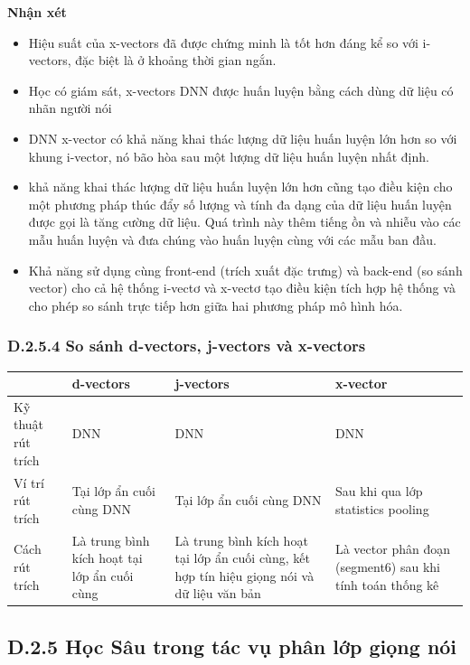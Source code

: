 \documentclass{article}
\begin{document}
	\textbf{Nhận xét}
	\begin{itemize}
		\item Hiệu suất của x-vectors đã được chứng minh là tốt hơn đáng kể so với i-vectors, đặc biệt là ở khoảng thời gian ngắn.
		\item Học có giám sát, x-vectors DNN được huấn luyện bằng cách dùng dữ liệu có nhãn người nói
		\item DNN x-vector có khả năng khai thác lượng dữ liệu huấn luyện lớn hơn so với khung i-vector, nó bão hòa sau một lượng dữ liệu huấn luyện nhất định.
		\item khả năng khai thác lượng dữ liệu huấn luyện lớn hơn cũng tạo điều kiện cho một phương pháp thúc đẩy số lượng và tính đa dạng của dữ liệu huấn luyện được gọi là tăng cường dữ liệu. Quá trình này thêm tiếng ồn và nhiễu vào các mẫu huấn luyện và đưa chúng vào huấn luyện cùng với các mẫu ban đầu.
		\item Khả năng sử dụng cùng front-end (trích xuất đặc trưng) và back-end (so sánh vector) cho cả hệ thống i-vectơ và x-vectơ tạo điều kiện tích hợp hệ thống và cho phép so sánh trực tiếp hơn giữa hai phương pháp mô hình hóa.
	\end{itemize}
	
	\subsubsection{D.2.5.4 So sánh d-vectors, j-vectors và x-vectors}
		\begin{table}[H]
		\centering
		\begin{tabular}{ |p{2cm} |p{4cm} | p{4cm} | p{4cm}  |}\hline
			& d-vectors & j-vectors & x-vector \\\hline
			Kỹ thuật rút trích & DNN & DNN & DNN\\ \hline
			Ví trí rút trích & Tại lớp ẩn cuối cùng DNN & Tại lớp ẩn cuối cùng DNN & Sau khi qua lớp statistics pooling\\\hline
			Cách rút trích & Là trung bình kích hoạt tại lớp ẩn cuối cùng & Là trung bình kích hoạt tại lớp ẩn cuối cùng, kết hợp tín hiệu giọng nói và dữ liệu văn bản & Là vector phân đoạn (segment6) sau khi tính toán thống kê\\\hline
		\end{tabular}
	\end{table}
	\subsection{D.2.5 Học Sâu trong tác vụ phân lớp giọng nói}
\end{document}

